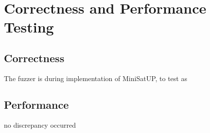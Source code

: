 \chapter{Correctness and Performance Testing}

\section{Correctness}


The fuzzer is during implementation of MiniSatUP, to test as




\section{Performance}


no discrepancy occurred


